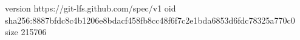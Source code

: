 version https://git-lfs.github.com/spec/v1
oid sha256:8887bfdc8c4b1206e8bdacf458fb8cc48f6f7c2e1bda6853d6fdc78325a770c0
size 215706
